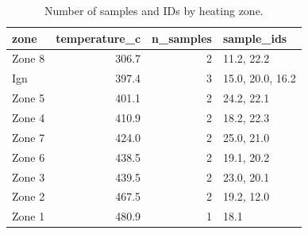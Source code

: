 \begin{table}[ht!]
\centering
\caption{Number of samples and IDs by heating zone.}
\label{tab:zone\_membership}
\begin{tabular}{lrrl}
\toprule
\textbf{zone} & \textbf{temperature\_c} & \textbf{n\_samples} & \textbf{sample\_ids} \\
\midrule
Zone 8 & 306.7 & 2 & 11.2, 22.2 \\
Ign & 397.4 & 3 & 15.0, 20.0, 16.2 \\
Zone 5 & 401.1 & 2 & 24.2, 22.1 \\
Zone 4 & 410.9 & 2 & 18.2, 22.3 \\
Zone 7 & 424.0 & 2 & 25.0, 21.0 \\
Zone 6 & 438.5 & 2 & 19.1, 20.2 \\
Zone 3 & 439.5 & 2 & 23.0, 20.1 \\
Zone 2 & 467.5 & 2 & 19.2, 12.0 \\
Zone 1 & 480.9 & 1 & 18.1 \\
\bottomrule
\end{tabular}
\end{table}
